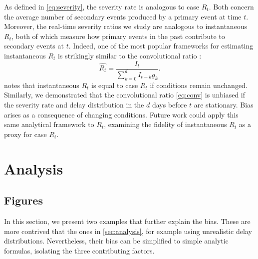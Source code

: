\documentclass{article}
\begin{document}
As defined in \ref{eq:severity}, the severity rate is analogous to case $R_t$. Both concern the average number of secondary events produced by a primary event at time $t$. Moreover, the real-time severity ratios we study are analogous to instantaneous $R_t$, both of which measure how primary events in the past contribute to secondary events at $t$. Indeed, one of the most popular frameworks for estimating instantaneous $R_t$ is strikingly similar to the convolutional ratio \citep{fraser2007,wallinga2007how,cori2013new,rtestim}:
\begin{equation}\label{eq:instRt}
    \hat{R_t} = \frac{I_t}{\sum_{k=0}^d I_{t-k}g_k}.
\end{equation}
\citet{fraser2007} notes that instantaneous $R_t$ is equal to case $R_t$ if conditions remain unchanged. Similarly, we demonstrated that the convolutional ratio \ref{eq:conv} is unbiased if the severity rate and delay distribution in the $d$ days before $t$ are stationary. Bias arises as a consequence of changing conditions. Future work could apply this same analytical framework to $R_t$, examining the fidelity of instantaneous $R_t$ as a proxy for case $R_t$. 





\pagebreak
\appendix
\section{Analysis}\label{apx:analysis}
\subsection{Figures}
In this section, we present two examples that further explain the bias. These are more contrived that the ones in \ref{sec:analysis}, for example using unrealistic delay distributions. Nevertheless, their bias can be simplified to simple analytic formulas, isolating the three contributing factors.
\end{document}
